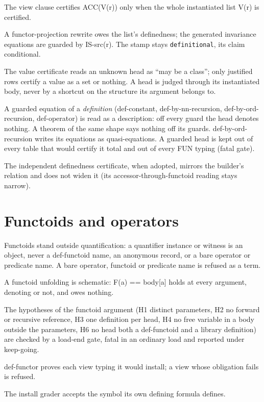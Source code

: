 \begin{description}[style=nextline,leftmargin=1.4cm]
\item[DS-28]\label{ds:28} The view clause certifies ACC(V(r)) only when the whole instantiated list V(r) is certified.
\item[DS-29]\label{ds:29} A functor-projection rewrite owes the list's definedness; the generated invariance equations are guarded by IS-src(r). The stamp stays \texttt{definitional}, its claim conditional.
\item[DS-30]\label{ds:30} The value certificate reads an unknown head as ``may be a class''; only justified rows certify a value as a set or nothing. A head is judged through its instantiated body, never by a shortcut on the structure its argument belongs to.
\item[DS-31]\label{ds:31} A guarded equation of a \emph{definition} (def-constant, def-by-nn-recursion, def-by-ord-recursion, def-operator) is read as a description: off every guard the head denotes nothing. A theorem of the same shape says nothing off its guards. def-by-ord-recursion writes its equations as quasi-equations. A guarded head is kept out of every table that would certify it total and out of every FUN typing (fatal gate).
\item[DS-32]\label{ds:32} The independent definedness certificate, when adopted, mirrors the builder's relation and does not widen it (its accessor-through-functoid reading stays narrow).
\end{description}
\section*{Functoids and operators}
\begin{description}[style=nextline,leftmargin=1.4cm]
\item[DS-33]\label{ds:33} Functoids stand outside quantification: a quantifier instance or witness is an object, never a def-functoid name, an anonymous record, or a bare operator or predicate name. A bare operator, functoid or predicate name is refused as a term.
\item[DS-34]\label{ds:34} A functoid unfolding is schematic: F(a) == body[a] holds at every argument, denoting or not, and owes nothing.
\item[DS-35]\label{ds:35} The hypotheses of the functoid argument (H1 distinct parameters, H2 no forward or recursive reference, H3 one definition per head, H4 no free variable in a body outside the parameters, H6 no head both a def-functoid and a library definition) are checked by a load-end gate, fatal in an ordinary load and reported under keep-going.
\item[DS-36]\label{ds:36} def-functor proves each view typing it would install; a view whose obligation fails is refused.
\item[DS-37]\label{ds:37} The install grader accepts the symbol its own defining formula defines.
\end{description}
